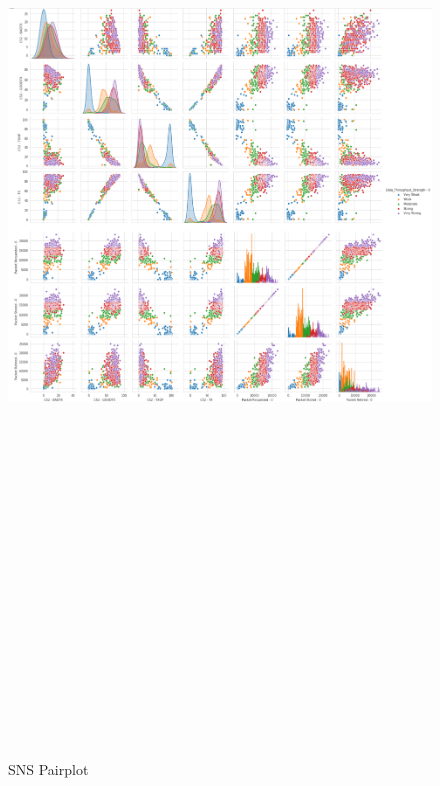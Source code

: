 \begin{figure} [ht]
    \centering
    \includegraphics[width=14.6cm,height=200.0cm,keepaspectratio]{pages/Chapter4/Chapter 4 Images/Pairplot.PNG}
    \caption{SNS Pairplot}
    \label{fig_pp}
\end{figure}
 
